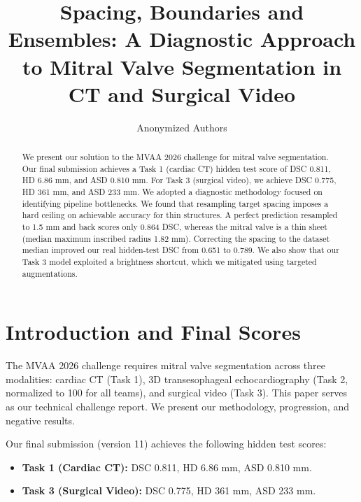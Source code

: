 \documentclass[runningheads]{llncs}
\begin{document}
\title{Spacing, Boundaries and Ensembles: A Diagnostic Approach to Mitral Valve Segmentation in CT and Surgical Video}

\author{Anonymized Authors}

\maketitle

\begin{abstract}
We present our solution to the MVAA 2026 challenge for mitral valve segmentation. Our final submission achieves a Task 1 (cardiac CT) hidden test score of DSC 0.811, HD 6.86 mm, and ASD 0.810 mm. For Task 3 (surgical video), we achieve DSC 0.775, HD 361 mm, and ASD 233 mm. We adopted a diagnostic methodology focused on identifying pipeline bottlenecks. We found that resampling target spacing imposes a hard ceiling on achievable accuracy for thin structures. A perfect prediction resampled to 1.5 mm and back scores only 0.864 DSC, whereas the mitral valve is a thin sheet (median maximum inscribed radius 1.82 mm). Correcting the spacing to the dataset median improved our real hidden-test DSC from 0.651 to 0.789. We also show that our Task 3 model exploited a brightness shortcut, which we mitigated using targeted augmentations.

\end{abstract}

\section{Introduction and Final Scores}

The MVAA 2026 challenge requires mitral valve segmentation across three modalities: cardiac CT (Task 1), 3D transesophageal echocardiography (Task 2, normalized to 100 for all teams), and surgical video (Task 3). This paper serves as our technical challenge report. We present our methodology, progression, and negative results.

Our final submission (version 11) achieves the following hidden test scores:
\begin{itemize}
    \item \textbf{Task 1 (Cardiac CT):} DSC 0.811, HD 6.86 mm, ASD 0.810 mm.
    \item \textbf{Task 3 (Surgical Video):} DSC 0.775, HD 361 mm, ASD 233 mm.
\end{itemize}
\end{document}
